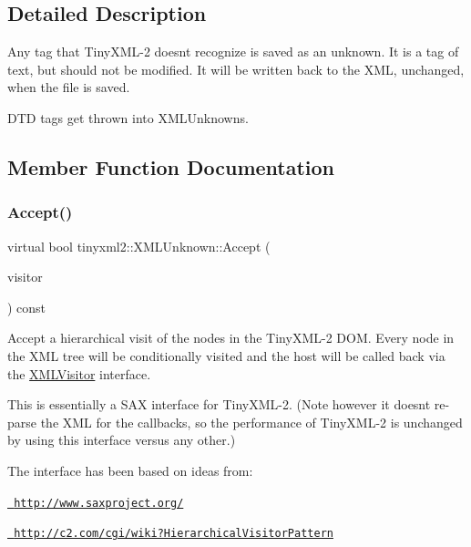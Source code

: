 \subsection{Detailed Description}
Any tag that Tiny\+X\+M\+L-\/2 doesn\textquotesingle{}t recognize is saved as an unknown. It is a tag of text, but should not be modified. It will be written back to the X\+ML, unchanged, when the file is saved.

D\+TD tags get thrown into X\+M\+L\+Unknowns. 

\subsection{Member Function Documentation}
\mbox{\label{classtinyxml2_1_1XMLUnknown_a70983aa1b1cff3d3aa6d4d0a80e5ee48}} 
\subsubsection{\texorpdfstring{Accept()}{Accept()}}
{\footnotesize\ttfamily virtual bool tinyxml2\+::\+X\+M\+L\+Unknown\+::\+Accept (\begin{DoxyParamCaption}\item[{\mbox{\hyperlink{classtinyxml2_1_1XMLVisitor}{X\+M\+L\+Visitor}} $\ast$}]{visitor }\end{DoxyParamCaption}) const\hspace{0.3cm}{\ttfamily [virtual]}}

Accept a hierarchical visit of the nodes in the Tiny\+X\+M\+L-\/2 D\+OM. Every node in the X\+ML tree will be conditionally visited and the host will be called back via the \mbox{\hyperlink{classtinyxml2_1_1XMLVisitor}{X\+M\+L\+Visitor}} interface.

This is essentially a S\+AX interface for Tiny\+X\+M\+L-\/2. (Note however it doesn\textquotesingle{}t re-\/parse the X\+ML for the callbacks, so the performance of Tiny\+X\+M\+L-\/2 is unchanged by using this interface versus any other.)

The interface has been based on ideas from\+:


\begin{DoxyItemize}
\item \href{http://www.saxproject.org/}{\texttt{ http\+://www.\+saxproject.\+org/}}
\item \href{http://c2.com/cgi/wiki?HierarchicalVisitorPattern}{\texttt{ http\+://c2.\+com/cgi/wiki?\+Hierarchical\+Visitor\+Pattern}}
\end{DoxyItemize}

